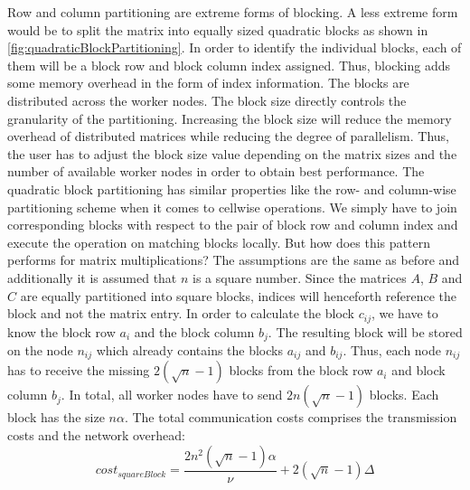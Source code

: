 Row and column partitioning are extreme forms of blocking. A less extreme form would be to split the matrix into equally sized quadratic blocks as shown in \cref{fig:quadraticBlockPartitioning}. In order to identify the individual blocks, each of them will be a block row and block column index assigned. Thus, blocking adds some memory overhead in the form of index information. The blocks are distributed across the worker nodes. The block size directly controls the granularity of the partitioning. Increasing the block size will reduce the memory overhead of distributed matrices while reducing the degree of parallelism. Thus, the user has to adjust the block size value depending on the matrix sizes and the number of available worker nodes in order to obtain best performance. The quadratic block partitioning has similar properties like the row- and column-wise partitioning scheme when it comes to cellwise operations. We simply have to join corresponding blocks with respect to the pair of block row and column index and execute the operation on matching blocks locally. But how does this pattern performs for matrix multiplications? The assumptions are the same as before and additionally it is assumed that $n$ is a square number. Since the matrices $A$, $B$ and $C$ are equally partitioned into square blocks, indices will henceforth reference the block and not the matrix entry. In order to calculate the block $c_{ij}$, we have to know the block row $a_{i}$ and the block column $b_{j}$. The resulting block will be stored on the node $n_{ij}$ which already contains the blocks $a_{ij}$ and $b_{ij}$. Thus, each node $n_{ij}$ has to receive the missing $2\left(\sqrt{n}-1\right)$ blocks from the block row $a_{i}$ and block column $b_{j}$. In total, all worker nodes have to send $2n\left(\sqrt{n}-1\right)$ blocks. Each block has the size $n\alpha$. The total communication costs comprises the transmission costs and the network overhead:
\begin{displaymath}
	cost_{squareBlock} = \frac{2n^2\left(\sqrt{n}-1\right)\alpha}{\nu} + 2\left(\sqrt{n}-1\right)\Delta
\end{displaymath}
